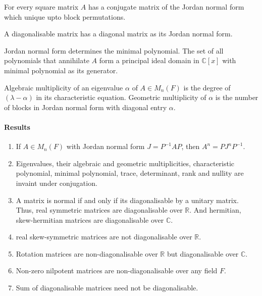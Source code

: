 \begin{note}
	For every square matrix $A$ has a conjugate matrix of the Jordan normal form which unique upto block permutations.
\end{note}

\begin{definition}[diagonalisable]
	A diagonalisable matrix has a diagonal matrix as its Jordan normal form.
\end{definition}

\begin{note}
	Jordan normal form determines the minimal polynomial.
	The set of all polynomials that annihilate $A$ form a principal ideal domain in $\mathbb{C}[x]$ with minimal polynomial as its generator.
\end{note}

\begin{definition}[multiplicity]
	Algebraic multiplicity of an eigenvalue $\alpha$ of $A \in M_n(F)$ is the degree of $(\lambda-\alpha)$ in its characteristic equation.
	Geometric multiplicity of $\alpha$ is the number of blocks in Jordan normal form with diagonal entry $\alpha$.
\end{definition}

\paragraph{Results}
\begin{enumerate}
	\item If $A \in M_n(F)$ with Jordan normal form $J = P^{-1}AP$, then $A^n = PJ^nP^{-1}$.
	\item Eigenvalues, their algebraic and geometric multiplicities, characteristic polynomial, minimal polynomial, trace, determinant, rank and nullity are invaint under conjugation.
	\item A matrix is normal if and only if its diagonalisable by a unitary matrix.
		Thus, real symmetric matrices are diagonalisable over $\mathbb{R}$.
		And hermitian, skew-hermitian matrices are diagonalisable over $\mathbb{C}$.
	\item real skew-symmetric matrices are not diagonalisable over $\mathbb{R}$.
	\item Rotation matrices are non-diagonalisable over $\mathbb{R}$ but diagonalisable over $\mathbb{C}$.
	\item Non-zero nilpotent matrices are non-diagonalisable over any field $F$.
	\item Sum of diagonalisable matrices need not be diagonalisable.
\end{enumerate}

